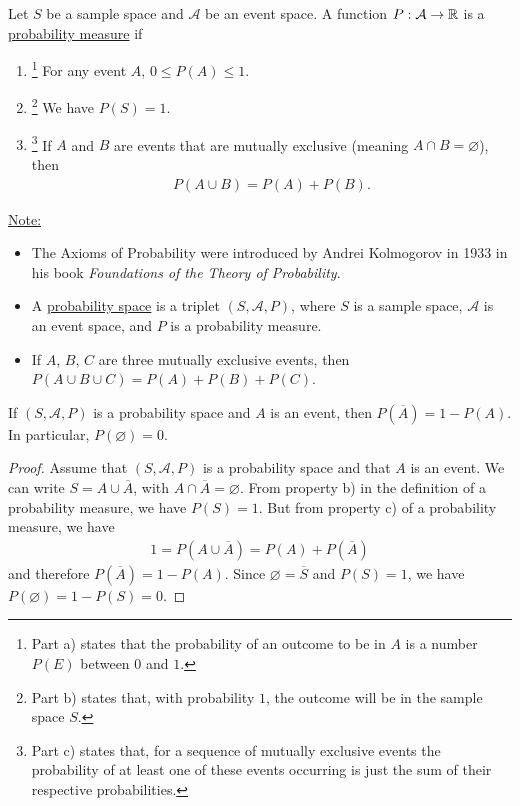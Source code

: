 \begin{definition}
Let $S$ be a sample space and $\mathcal{A}$ be an event space. A function $P : \mathcal{A} \rightarrow \mathbb{R}$ is a \underline{probability measure} if
	\begin{enumerate}[label=\alph*)]
	\item\footnote{Part a) states that the probability of an outcome to be in $A$ is a number $P (E)$ between $0$ and $1$.} For any event $A$, $0 \leq P (A) \leq 1$. 
	\item\footnote{Part b) states that, with probability $1$, the outcome will be in the sample space $S$.} We have $P(S) = 1$.
	\item\footnote{Part c) states that, for a sequence of mutually exclusive events the probability of at least one of these events occurring is just the sum of their respective probabilities.} If $A$ and $B$ are events that are mutually exclusive (meaning $A \cap B = \varnothing$), then
		\begin{align*}
		P ( A \cup B ) = P (A) + P (B) .
		\end{align*}
	\end{enumerate}
\end{definition}
\underline{Note:}
	\begin{itemize}
	\item The Axioms of Probability were introduced by Andrei Kolmogorov in 1933 in his book \textit{Foundations of the Theory of Probability}.
	\item A \underline{probability space} is a triplet $(S, \mathcal{A} , P )$, where $S$ is a sample space, $\mathcal{A}$ is an event space, and $P$ is a probability measure.
	\item If $A$, $B$, $C$ are three mutually exclusive events, then $P (A \cup B \cup C ) = P (A ) + P (B) + P (C)$.
	\end{itemize}

	\begin{theorem}
	If $(S , \mathcal{A} , P)$ is a probability space and $A$ is an event, then $P (\overline{A}) = 1 - P (A)$. In particular, $P (\varnothing)= 0$.
	\end{theorem}
	\begin{proof}
	Assume that $(S, \mathcal{A}, P)$ is a probability space and that $A$ is an event. We can write $S = A \cup \overline{A}$, with $A \cap \overline{A} = \varnothing$. From property b) in the definition of a probability measure, we have $P (S) = 1$. But from property c) of a probability measure, we have
		\begin{align*}
		1 = P (A \cup \overline{A}) = P (A) + P (\overline{A})
		\end{align*}
	and therefore $P (\overline{A}) = 1 - P (A)$. Since $\varnothing = \overline{S}$ and $P (S) = 1$, we have $P (\varnothing) = 1 - P (S) = 0$.
	\end{proof}


